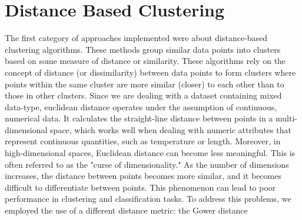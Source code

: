 \documentclass[a4paper]{article}
\begin{document}
\section{Distance Based Clustering}
The first category of approaches implemented were about distance-based clustering algorithms. These methods group similar data points into clusters based on some measure of distance or similarity. These algorithms rely on the concept of distance (or dissimilarity) between data points to form clusters where points within the same cluster are more similar (closer) to each other than to those in other clusters. Since we are dealing with a dataset containing mixed data-type, euclidean distance operates under the assumption of continuous, numerical data. It calculates the straight-line distance between points in a multi-dimensional space, which works well when dealing with numeric attributes that represent continuous quantities, such as temperature or length. Moreover, in high-dimensional spaces, Euclidean distance can become less meaningful. This is often referred to as the "curse of dimensionality." As the number of dimensions increases, the distance between points becomes more similar, and it becomes difficult to differentiate between points. This phenomenon can lead to poor performance in clustering and classification tasks. \newline
To address this problems, we employed the use of a different distance metric: the Gower distance
\end{document}
